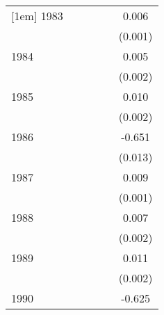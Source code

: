 {\begin{tabular}{l*{5}{c}}
[1em]
1983                &                     &                     &                     &                     &       0.006\sym{***}\\
                    &                     &                     &                     &                     &     (0.001)         \\
[1em]
1984                &                     &                     &                     &                     &       0.005\sym{***}\\
                    &                     &                     &                     &                     &     (0.002)         \\
[1em]
1985                &                     &                     &                     &                     &       0.010\sym{***}\\
                    &                     &                     &                     &                     &     (0.002)         \\
[1em]
1986                &                     &                     &                     &                     &      -0.651\sym{***}\\
                    &                     &                     &                     &                     &     (0.013)         \\
[1em]
1987                &                     &                     &                     &                     &       0.009\sym{***}\\
                    &                     &                     &                     &                     &     (0.001)         \\
[1em]
1988                &                     &                     &                     &                     &       0.007\sym{***}\\
                    &                     &                     &                     &                     &     (0.002)         \\
[1em]
1989                &                     &                     &                     &                     &       0.011\sym{***}\\
                    &                     &                     &                     &                     &     (0.002)         \\
[1em]
1990                &                     &                     &                     &                     &      -0.625\sym{***}\\

\end{tabular}}
